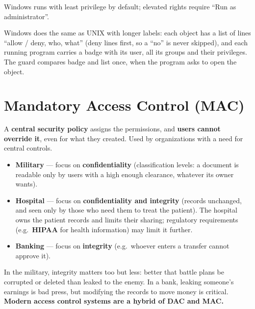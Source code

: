 \begin{rembox}[title=Least privilege by default]
Windows runs with least privilege by default; elevated rights require
``Run as administrator''.
\end{rembox}

\begin{goatbox}
Windows does the same as UNIX with longer labels: each object has a list of lines ``allow / deny,
who, what'' (deny lines first, so a ``no'' is never skipped), and each running program carries a
badge with its user, all its groups and their privileges. The guard compares badge and list once,
when the program asks to open the object.
\end{goatbox}

\section{Mandatory Access Control (MAC)}

\begin{defnbox}[title=Mandatory Access Control (MAC)]
A \textbf{central security policy} assigns the permissions, and \textbf{users cannot
override it}, even for what they created. Used by organizations with a need for central
controls.
\end{defnbox}

\begin{exbox}[title=Where is MAC used?]
\begin{itemize}
  \item \textbf{Military} --- focus on \textbf{confidentiality} (classification levels:
        a document is readable only by users with a high enough clearance, whatever its
        owner wants).
  \item \textbf{Hospital} --- focus on \textbf{confidentiality and integrity} (records
        unchanged, and seen only by those who need them to treat the patient). The
        hospital owns the patient records and limits their sharing; regulatory
        requirements (e.g.\ \textbf{HIPAA} for health information) may limit it further.
  \item \textbf{Banking} --- focus on \textbf{integrity} (e.g.\ whoever enters a transfer
        cannot approve it).
\end{itemize}
In the military, integrity matters too but less: better that battle plans be corrupted or
deleted than leaked to the enemy. In a bank, leaking someone's earnings is bad press, but
modifying the records to move money is critical. \textbf{Modern access control systems are a
hybrid of DAC and MAC.}
\end{exbox}

